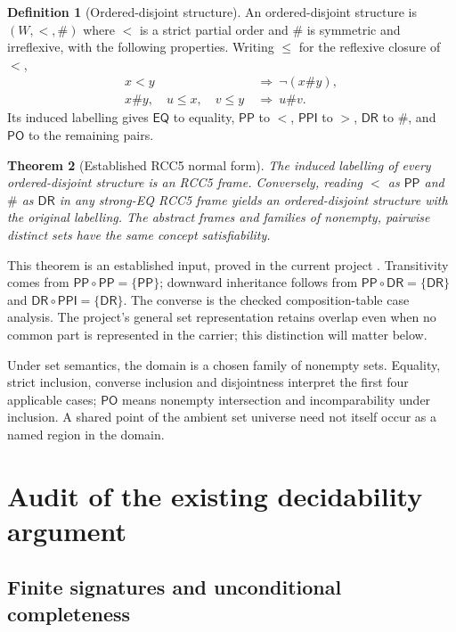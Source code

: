\documentclass[11pt,letterpaper]{article}
\newcommand{\EQ}{\mathsf{EQ}}
\newcommand{\PP}{\mathsf{PP}}
\newcommand{\PPI}{\mathsf{PPI}}
\newcommand{\PO}{\mathsf{PO}}
\newcommand{\DR}{\mathsf{DR}}
\newtheorem{theorem}{Theorem}[section]
\theoremstyle{definition}
\newtheorem{definition}[theorem]{Definition}
\theoremstyle{remark}
\begin{document}
\begin{definition}[Ordered-disjoint structure]
An ordered-disjoint structure is $(W,<,\#)$ where $<$ is a strict partial
order and $\#$ is symmetric and irreflexive, with the following properties.
Writing $\leq$ for the reflexive closure of $<$,
\begin{align}
x<y&\ \Longrightarrow\ \neg(x\#y),\label{eq:separate}\\
x\#y,\quad u\leq x,\quad v\leq y
 &\ \Longrightarrow\ u\#v.\label{eq:downward}
\end{align}
Its induced labelling gives $\EQ$ to equality, $\PP$ to $<$,
$\PPI$ to $>$, $\DR$ to $\#$, and $\PO$ to the remaining pairs.
\end{definition}

\begin{theorem}[Established RCC5 normal form]
\label{thm:normal}
The induced labelling of every ordered-disjoint structure is an RCC5
frame. Conversely, reading $<$ as $\PP$ and $\#$ as $\DR$ in any
strong-EQ RCC5 frame yields an ordered-disjoint structure with the original
labelling. The abstract frames and families of nonempty, pairwise distinct
sets have the same concept satisfiability.
\end{theorem}

This theorem is an established input, proved in the current project
\cite{fragment,lean}. Transitivity comes from
$\PP\circ\PP=\{\PP\}$; downward inheritance follows from
$\PP\circ\DR=\{\DR\}$ and $\DR\circ\PPI=\{\DR\}$.
The converse is the checked composition-table case analysis. The project's
general set representation retains overlap even when no common part is
represented in the carrier; this distinction will matter below.

Under set semantics, the domain is a chosen family of nonempty sets.
Equality, strict inclusion, converse inclusion and disjointness interpret
the first four applicable cases; $\PO$ means nonempty intersection and
incomparability under inclusion. A shared point of the ambient set universe
need not itself occur as a named region in the domain.

\section{Audit of the existing decidability argument}
\label{sec:audit}

\subsection{Finite signatures and unconditional completeness}
\end{document}
